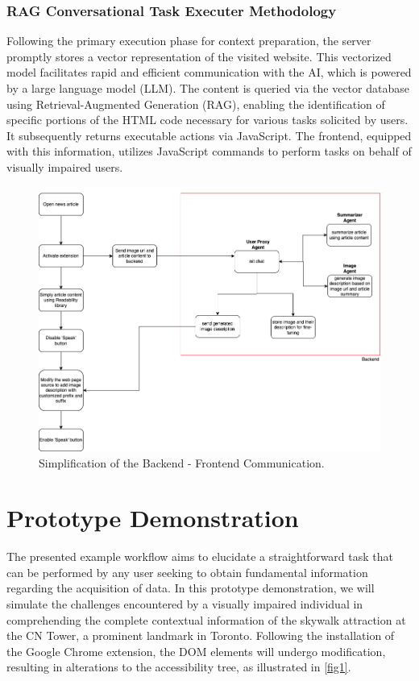 \documentclass[conference]{IEEEtran}
\begin{document}
\subsubsection{RAG Conversational Task Executer Methodology}

Following the primary execution phase for context preparation, the server promptly stores a vector representation of the visited website. This vectorized model facilitates rapid and efficient communication with the AI, which is powered by a large language model (LLM). The content is queried via the vector database using Retrieval-Augmented Generation (RAG), enabling the identification of specific portions of the HTML code necessary for various tasks solicited by users. It subsequently returns executable actions via JavaScript. The frontend, equipped with this information, utilizes JavaScript commands to perform tasks on behalf of visually impaired users.


\begin{figure}[h]
\centerline{\includegraphics[width=\linewidth]{images/img1.png}}
\caption{Simplification of the Backend - Frontend Communication.}
\label{fig1}
\end{figure}

\section{Prototype Demonstration}\label{demo}

The presented example workflow aims to elucidate a straightforward task that can be performed by any user seeking to obtain fundamental information regarding the acquisition of data. In this prototype demonstration, we will simulate the challenges encountered by a visually impaired individual in comprehending the complete contextual information of the skywalk attraction at the CN Tower, a prominent landmark in Toronto. Following the installation of the Google Chrome extension, the DOM elements will undergo modification, resulting in alterations to the accessibility tree, as illustrated in \autoref{fig1}.
\end{document}
